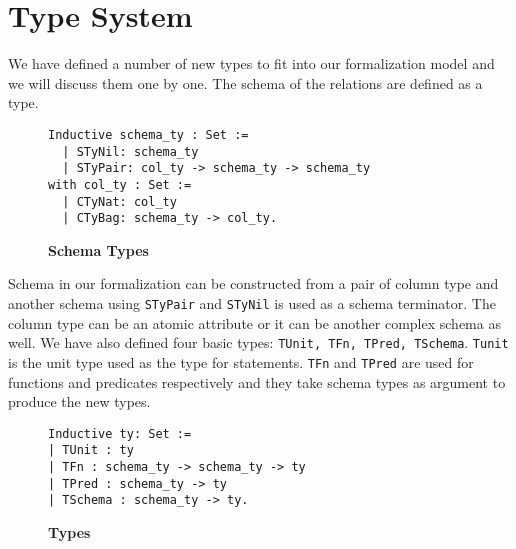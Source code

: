 \section{Type System}
\label{sec:types}

We have defined a number of new types to fit into our formalization model and we will discuss them one by one. The schema of the relations are defined as a type.

\begin{figure}
\begin{lstlisting}
Inductive schema_ty : Set :=
  | STyNil: schema_ty
  | STyPair: col_ty -> schema_ty -> schema_ty
with col_ty : Set :=
  | CTyNat: col_ty
  | CTyBag: schema_ty -> col_ty.
\end{lstlisting}
\caption{\textbf{Schema Types}}
\label{fig-schema_types}
\end{figure}

Schema in our formalization can be constructed from a pair of column type and another schema using \texttt{STyPair} and \texttt{STyNil} is used as a schema terminator. The column type can be an atomic attribute or it can be another complex schema as well. We have also defined four basic types: \texttt{TUnit, TFn, TPred, TSchema}. \texttt{Tunit} is the unit type used as the type for statements. \texttt{TFn} and \texttt{TPred} are used for functions and predicates respectively and they take schema types as argument to produce the new types.

\begin{figure}
\begin{lstlisting}
Inductive ty: Set :=
| TUnit : ty
| TFn : schema_ty -> schema_ty -> ty
| TPred : schema_ty -> ty
| TSchema : schema_ty -> ty.
\end{lstlisting}
\caption{\textbf{Types}}
\label{fig-types}
\end{figure}

